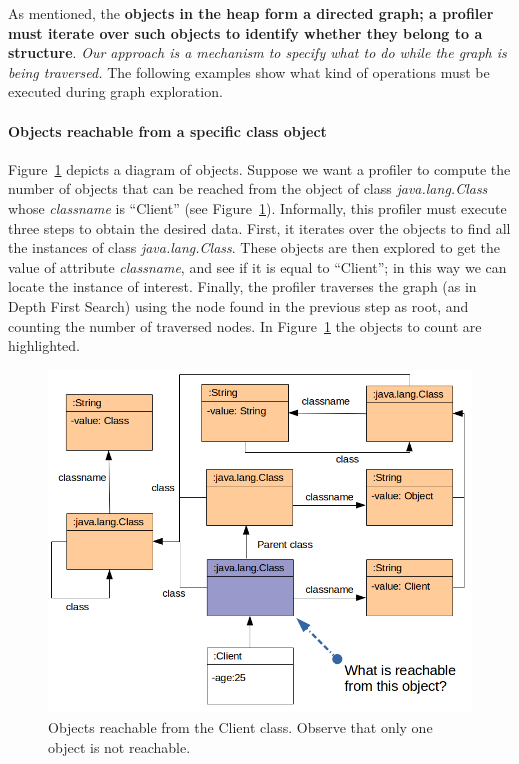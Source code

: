 
As mentioned, the \textbf{objects in the heap form a directed graph; a profiler must iterate over such objects to identify whether they belong to a structure}.
\textit{Our approach is a mechanism to specify what to do while the graph is being traversed.}
The following examples show what kind of operations must be executed during graph exploration.

\paragraph{Objects reachable from a specific class object}

Figure~\ref{fig:reachable-from-class-object} depicts a diagram of objects.
Suppose we want a profiler to compute the number of objects that can be reached from the object of class \textit{java.lang.Class} whose \textit{classname} is ``Client'' (see Figure~\ref{fig:reachable-from-class-object}).
Informally, this profiler must execute three steps to obtain the desired data.
First, it iterates over the objects to find all the instances of class \textit{java.lang.Class}.
These objects are then explored to get the value of attribute \textit{classname}, and see if it is equal to ``Client''; in this way we can locate the instance of interest.
Finally, the profiler traverses the graph (as in Depth First Search) using the node found in the previous step as root, and counting the number of traversed nodes.
In Figure~\ref{fig:reachable-from-class-object} the objects to count are highlighted.

\begin{figure}[!ht]
\centering
\includegraphics[scale=0.5]{./chapter6/fig/example1.png}
\caption{Objects reachable from the Client class. Observe that only one object is not reachable.}\label{fig:reachable-from-class-object}
\end{figure}

